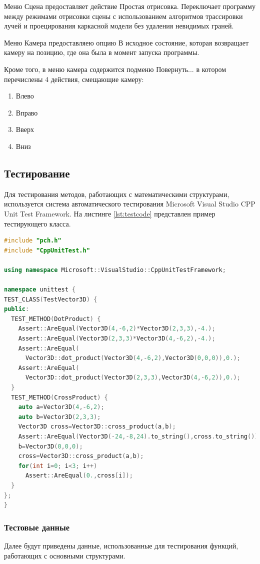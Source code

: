Меню Сцена предоставляет действие Простая отрисовка. Переключает программу между режимами отрисовки сцены с использованием алгоритмов трассировки лучей и проецирования каркасной модели без удаления невидимых граней.

Меню Камера предоставляею опцию В исходное состояние, которая возвращает камеру на позицию, где она была в момент запуска программы.

Кроме того, в меню камера содержится подменю Повернуть... в котором перечислены 4 действия, смещающие камеру:
\begin{enumerate}
	\item Влево
	\item Вправо
	\item Вверх
	\item Вниз
\end{enumerate}

\subsection{Тестирование}
Для тестирования методов, работающих с математическими структурами, используется система автоматического тестирования Microsoft Visual Studio CPP Unit Test Framework. На листинге \ref{lst:testcode} представлен пример тестирующего класса.

\begin{lstlisting}[caption={Класс, реализующий тестирование методов для работы с трёхмерным вектором},label={lst:testcode},language=c++]
#include "pch.h"
#include "CppUnitTest.h"

using namespace Microsoft::VisualStudio::CppUnitTestFramework;

namespace unittest {	
TEST_CLASS(TestVector3D) {
public:
  TEST_METHOD(DotProduct) {
    Assert::AreEqual(Vector3D(4,-6,2)*Vector3D(2,3,3),-4.);
    Assert::AreEqual(Vector3D(2,3,3)*Vector3D(4,-6,2),-4.);
    Assert::AreEqual(
      Vector3D::dot_product(Vector3D(4,-6,2),Vector3D(0,0,0)),0.);
    Assert::AreEqual(
      Vector3D::dot_product(Vector3D(2,3,3),Vector3D(4,-6,2)),0.);
  }
  TEST_METHOD(CrossProduct) {
    auto a=Vector3D(4,-6,2);
    auto b=Vector3D(2,3,3);
    Vector3D cross=Vector3D::cross_product(a,b);
    Assert::AreEqual(Vector3D(-24,-8,24).to_string(),cross.to_string());	
    b=Vector3D(0,0,0);
    cross=Vector3D::cross_product(a,b);
    for(int i=0; i<3; i++)
      Assert::AreEqual(0.,cross[i]);
  }
};
}
\end{lstlisting}
\subsubsection{Тестовые данные}
Далее будут приведены данные, использованные для тестирования функций, работающих с основными структурами.

